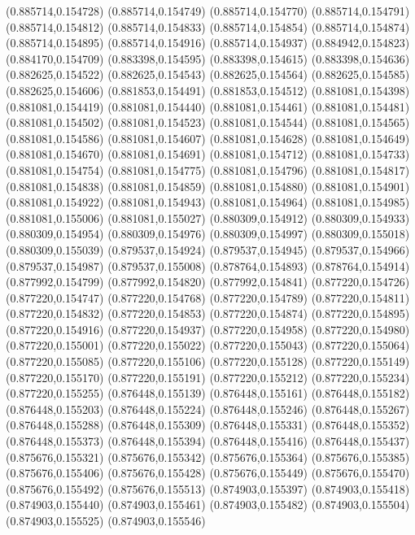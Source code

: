 (0.885714,0.154728)
(0.885714,0.154749)
(0.885714,0.154770)
(0.885714,0.154791)
(0.885714,0.154812)
(0.885714,0.154833)
(0.885714,0.154854)
(0.885714,0.154874)
(0.885714,0.154895)
(0.885714,0.154916)
(0.885714,0.154937)
(0.884942,0.154823)
(0.884170,0.154709)
(0.883398,0.154595)
(0.883398,0.154615)
(0.883398,0.154636)
(0.882625,0.154522)
(0.882625,0.154543)
(0.882625,0.154564)
(0.882625,0.154585)
(0.882625,0.154606)
(0.881853,0.154491)
(0.881853,0.154512)
(0.881081,0.154398)
(0.881081,0.154419)
(0.881081,0.154440)
(0.881081,0.154461)
(0.881081,0.154481)
(0.881081,0.154502)
(0.881081,0.154523)
(0.881081,0.154544)
(0.881081,0.154565)
(0.881081,0.154586)
(0.881081,0.154607)
(0.881081,0.154628)
(0.881081,0.154649)
(0.881081,0.154670)
(0.881081,0.154691)
(0.881081,0.154712)
(0.881081,0.154733)
(0.881081,0.154754)
(0.881081,0.154775)
(0.881081,0.154796)
(0.881081,0.154817)
(0.881081,0.154838)
(0.881081,0.154859)
(0.881081,0.154880)
(0.881081,0.154901)
(0.881081,0.154922)
(0.881081,0.154943)
(0.881081,0.154964)
(0.881081,0.154985)
(0.881081,0.155006)
(0.881081,0.155027)
(0.880309,0.154912)
(0.880309,0.154933)
(0.880309,0.154954)
(0.880309,0.154976)
(0.880309,0.154997)
(0.880309,0.155018)
(0.880309,0.155039)
(0.879537,0.154924)
(0.879537,0.154945)
(0.879537,0.154966)
(0.879537,0.154987)
(0.879537,0.155008)
(0.878764,0.154893)
(0.878764,0.154914)
(0.877992,0.154799)
(0.877992,0.154820)
(0.877992,0.154841)
(0.877220,0.154726)
(0.877220,0.154747)
(0.877220,0.154768)
(0.877220,0.154789)
(0.877220,0.154811)
(0.877220,0.154832)
(0.877220,0.154853)
(0.877220,0.154874)
(0.877220,0.154895)
(0.877220,0.154916)
(0.877220,0.154937)
(0.877220,0.154958)
(0.877220,0.154980)
(0.877220,0.155001)
(0.877220,0.155022)
(0.877220,0.155043)
(0.877220,0.155064)
(0.877220,0.155085)
(0.877220,0.155106)
(0.877220,0.155128)
(0.877220,0.155149)
(0.877220,0.155170)
(0.877220,0.155191)
(0.877220,0.155212)
(0.877220,0.155234)
(0.877220,0.155255)
(0.876448,0.155139)
(0.876448,0.155161)
(0.876448,0.155182)
(0.876448,0.155203)
(0.876448,0.155224)
(0.876448,0.155246)
(0.876448,0.155267)
(0.876448,0.155288)
(0.876448,0.155309)
(0.876448,0.155331)
(0.876448,0.155352)
(0.876448,0.155373)
(0.876448,0.155394)
(0.876448,0.155416)
(0.876448,0.155437)
(0.875676,0.155321)
(0.875676,0.155342)
(0.875676,0.155364)
(0.875676,0.155385)
(0.875676,0.155406)
(0.875676,0.155428)
(0.875676,0.155449)
(0.875676,0.155470)
(0.875676,0.155492)
(0.875676,0.155513)
(0.874903,0.155397)
(0.874903,0.155418)
(0.874903,0.155440)
(0.874903,0.155461)
(0.874903,0.155482)
(0.874903,0.155504)
(0.874903,0.155525)
(0.874903,0.155546)

